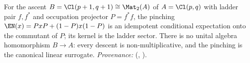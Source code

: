 For the ascent $B = \Cl(p+1, q+1) \cong \Mat_{2}(A)$ of $A = \Cl(p,q)$ with ladder pair $f, f^{*}$ and occupation projector $P = f^{*}f$, the pinching $\EN(x) = PxP + (1-P)x(1-P)$ is an idempotent conditional expectation onto the commutant of $P$; its kernel is the ladder sector. There is no unital algebra homomorphism $B \to A$: every descent is non-multiplicative, and the pinching is the canonical linear surrogate. \emph{Provenance:} \cite[Prop.~7.5, Thm.~7.6]{ButlerT1} (, ).
